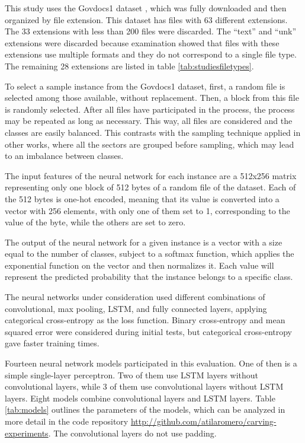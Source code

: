 
This study uses the Govdocs1 dataset \cite{garfinkel_bringing_2009}, which was fully downloaded and then organized by file extension.
This dataset has files with 63 different extensions. The 33 extensions with less than 200 files were discarded. The  ``text'' and ``unk'' extensions were discarded because examination showed that files with these extensions use multiple formats and they do not correspond to a single file type.
The remaining 28 extensions are listed in table \ref{tab:studiesfiletypes}.

To select a sample instance from the Govdocs1 dataset, first, a random file is selected among those available, without replacement. Then, a block from this file is randomly selected. After all files have participated in the process, the process may be repeated as long as necessary. This way, all files are considered and the classes are easily balanced.
This contrasts with the sampling technique applied in other works, where all the sectors are grouped before sampling, which may lead to an imbalance between classes.

The input features of the neural network for each instance are a 512x256 matrix representing only one block of 512 bytes of a random file of the dataset. Each of the 512 bytes is one-hot encoded, meaning that its value is converted into a vector with 256 elements, with only one of them set to 1, corresponding to the value of the byte, while the others are set to zero.


The output of the neural network for a given instance is a vector with a size equal to the number of classes, subject to a softmax function, which applies the exponential function on the vector and then normalizes it. Each value will represent the predicted probability that the instance belongs to a specific class.

The neural networks under consideration used different combinations of convolutional, max pooling, LSTM, and fully connected layers, applying categorical cross-entropy as the loss function. Binary cross-entropy  and mean squared error  were considered during initial tests, but categorical cross-entropy gave faster training times.

Fourteen neural network models participated in this evaluation. One of then is a simple single-layer perceptron. Two of them use LSTM layers without convolutional layers, while 3 of them use convolutional layers without LSTM layers. Eight models combine convolutional layers and LSTM layers. Table \ref{tab:models} outlines the parameters of the models, which can be analyzed in more detail in the code repository \sloppy\url{http://github.com/atilaromero/carving-experiments}. The convolutional layers do not use padding. 

